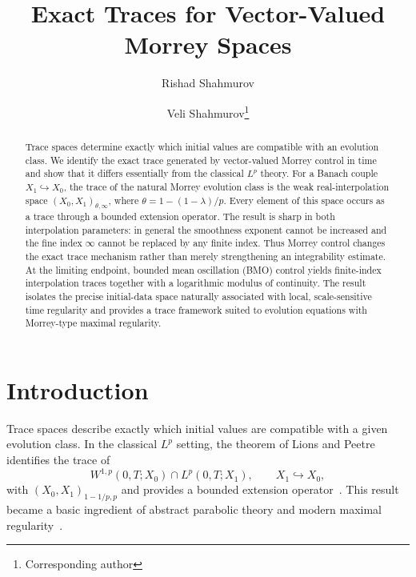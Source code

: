 \documentclass[smallextended,envcountsect,envcountsame]{svjour3}
\begin{document}
\title{Exact Traces for Vector-Valued Morrey Spaces}
\author{Rishad Shahmurov \and Veli Shahmurov\thanks{Corresponding author}}
\date{}
\maketitle

\begin{abstract}
Trace spaces determine exactly which initial values are compatible with an evolution class. We identify the exact trace generated by vector-valued Morrey control in time and show that it differs essentially from the classical $L^p$ theory. For a Banach couple $X_1\hookrightarrow X_0$, the trace of the natural Morrey evolution class is the weak real-interpolation space $(X_0,X_1)_{\theta,\infty}$, where $\theta=1-(1-\lambda)/p$. Every element of this space occurs as a trace through a bounded extension operator. The result is sharp in both interpolation parameters: in general the smoothness exponent cannot be increased and the fine index $\infty$ cannot be replaced by any finite index. Thus Morrey control changes the exact trace mechanism rather than merely strengthening an integrability estimate. At the limiting endpoint, bounded mean oscillation (BMO) control yields finite-index interpolation traces together with a logarithmic modulus of continuity. The result isolates the precise initial-data space naturally associated with local, scale-sensitive time regularity and provides a trace framework suited to evolution equations with Morrey-type maximal regularity.
\end{abstract}

\section{Introduction}
Trace spaces describe exactly which initial values are compatible with a given evolution class. In the classical $L^p$ setting, the theorem of Lions and Peetre identifies the trace of
\[
W^{1,p}(0,T;X_0)\cap L^p(0,T;X_1),\qquad X_1\hookrightarrow X_0,
\]
with $(X_0,X_1)_{1-1/p,p}$ and provides a bounded extension operator~\cite{LionsPeetre1964,Peetre1966}. This result became a basic ingredient of abstract parabolic theory and modern maximal regularity~\cite{Weis2001,KunstmannWeis2004}.
\end{document}
